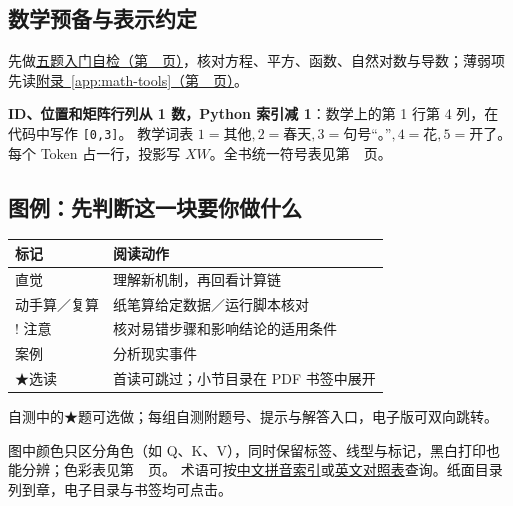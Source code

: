 \subsection*{数学预备与表示约定}
先做\hyperref[app:math-entry]{五题入门自检（第~\pageref*{app:math-entry}~页）}，核对方程、平方、函数、自然对数与导数；薄弱项先读\hyperref[app:math-tools]{附录~\ref*{app:math-tools}（第~\pageref*{app:math-tools}~页）}。


\textbf{ID、位置和矩阵行列从 1 数，Python 索引减 1}：数学上的第 1 行第 4 列，在代码中写作 \texttt{[0,3]}。
教学词表 $1=\text{其他},2=\text{春天},3=\text{句号“。”},4=\text{花},5=\text{开了}$。
每个 Token 占一行，投影写 $XW$。全书统一符号表见第~\pageref*{app:symbols}~页。

\subsection*{图例：先判断这一块要你做什么}
\noindent\begin{tabularx}{\linewidth}{@{}p{34mm}X@{}}
\toprule
标记 & 阅读动作\\\midrule
直觉 & 理解新机制，再回看计算链\\
动手算／复算 & 纸笔算给定数据／运行脚本核对\\
! 注意 & 核对易错步骤和影响结论的适用条件\\
案例 & 分析现实事件\\
{\symboliconfont ★}选读 & 首读可跳过；小节目录在 PDF 书签中展开\\
\bottomrule
\end{tabularx}\par
自测中的{\symboliconfont ★}题可选做；每组自测附题号、提示与解答入口，电子版可双向跳转。

图中颜色只区分角色（如 Q、K、V），同时保留标签、线型与标记，黑白打印也能分辨；色彩表见第~\pageref*{app:color-semantics}~页。
术语可按\hyperref[app:chinese-index]{中文拼音索引}或\hyperref[app:bilingual-glossary]{英文对照表}查询。纸面目录列到章，电子目录与书签均可点击。
\endgroup
